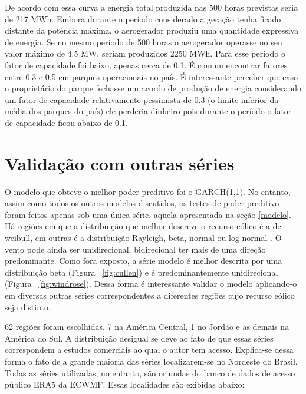\documentclass[
	12pt,				%
	openright,			%
	oneside,			%
	a4paper,			%
	english,			%
	french,				%
	spanish,			%
	brazil				%
	]{abntex2}
\begin{document}
De acordo com essa curva a energia total produzida nas 500 horas previstas seria de 217 MWh. Embora durante o período considerado a geração tenha ficado distante da potência máxima, o aerogerador produziu uma quantidade expressiva de energia. Se no mesmo período de 500 horas o aerogerador operasse no seu valor máximo de 4.5 MW, seriam produzidos 2250 MWh. Para esse período o fator de capacidade foi baixo, apenas cerca de 0.1. É comum encontrar fatores entre 0.3 e 0.5 em parques operacionais no país. É interessante perceber que caso o proprietário do parque fechasse um acordo de produção de energia considerando um fator de capacidade relativamente pessimista de 0.3 (o limite inferior da média dos parques do país) ele perderia dinheiro pois durante o período o fator de capacidade ficou abaixo de 0.1.

\chapter{Validação com outras séries}

O modelo que obteve o melhor poder preditivo foi o GARCH(1,1). No entanto, assim como todos os outros modelos discutidos, os testes  de poder preditivo foram feitos apenas sob uma única série, aquela apresentada na seção \ref{modelo}. Há regiões em que a distribuição que melhor descreve o recurso eólico é  a de weibull, em outras é a distribuição Rayleigh, beta, normal ou log-normal \cite{dists}. O vento pode ainda ser unidirecional, bidirecional ter mais de uma direção predominante. Como fora exposto, a série modelo é melhor descrita por uma distribuição beta (Figura ~\ref{fig:cullen}) e é predominantemente unidirecional (Figura ~\ref{fig:windrose}). Dessa forma é interessante validar o modelo aplicando-o em diversas outras séries correspondentes a diferentes regiões cujo recurso eólico seja distinto. 

62 regiões foram escolhidas. 7 na América Central, 1 no Jordão e as demais na América do Sul. A distribuição desigual se deve ao fato de que essas séries correspondem a estudos comerciais ao qual o autor tem acesso. Explica-se dessa forma o fato de a grande maioria das séries localizarem-se no Nordeste do Brasil. Todas as séries utilizadas, no entanto, são oriundas do banco de dados de acesso público ERA5 da ECWMF. Essas localidades são exibidas abaixo:
\end{document}
